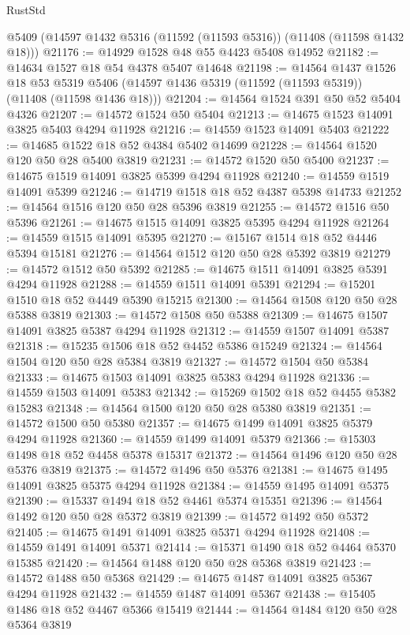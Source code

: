 \begin{lexlean}{RustStd}
\begin{coremodule}
    @5409
    (@14597 @1432 @5316 (@11592 (@11593 @5316)) (@11408 (@11598 @1432 @18)))
@21176 := @14929 @1528 @48 @55 @4423 @5408 @14952
@21182 := @14634 @1527 @18 @54 @4378 @5407 @14648
@21198 := @14564
    @1437
    @1526
    @18
    @53
    @5319
    @5406
    (@14597 @1436 @5319 (@11592 (@11593 @5319)) (@11408 (@11598 @1436 @18)))
@21204 := @14564 @1524 @391 @50 @52 @5404 @4326
@21207 := @14572 @1524 @50 @5404
@21213 := @14675 @1523 @14091 @3825 @5403 @4294 @11928
@21216 := @14559 @1523 @14091 @5403
@21222 := @14685 @1522 @18 @52 @4384 @5402 @14699
@21228 := @14564 @1520 @120 @50 @28 @5400 @3819
@21231 := @14572 @1520 @50 @5400
@21237 := @14675 @1519 @14091 @3825 @5399 @4294 @11928
@21240 := @14559 @1519 @14091 @5399
@21246 := @14719 @1518 @18 @52 @4387 @5398 @14733
@21252 := @14564 @1516 @120 @50 @28 @5396 @3819
@21255 := @14572 @1516 @50 @5396
@21261 := @14675 @1515 @14091 @3825 @5395 @4294 @11928
@21264 := @14559 @1515 @14091 @5395
@21270 := @15167 @1514 @18 @52 @4446 @5394 @15181
@21276 := @14564 @1512 @120 @50 @28 @5392 @3819
@21279 := @14572 @1512 @50 @5392
@21285 := @14675 @1511 @14091 @3825 @5391 @4294 @11928
@21288 := @14559 @1511 @14091 @5391
@21294 := @15201 @1510 @18 @52 @4449 @5390 @15215
@21300 := @14564 @1508 @120 @50 @28 @5388 @3819
@21303 := @14572 @1508 @50 @5388
@21309 := @14675 @1507 @14091 @3825 @5387 @4294 @11928
@21312 := @14559 @1507 @14091 @5387
@21318 := @15235 @1506 @18 @52 @4452 @5386 @15249
@21324 := @14564 @1504 @120 @50 @28 @5384 @3819
@21327 := @14572 @1504 @50 @5384
@21333 := @14675 @1503 @14091 @3825 @5383 @4294 @11928
@21336 := @14559 @1503 @14091 @5383
@21342 := @15269 @1502 @18 @52 @4455 @5382 @15283
@21348 := @14564 @1500 @120 @50 @28 @5380 @3819
@21351 := @14572 @1500 @50 @5380
@21357 := @14675 @1499 @14091 @3825 @5379 @4294 @11928
@21360 := @14559 @1499 @14091 @5379
@21366 := @15303 @1498 @18 @52 @4458 @5378 @15317
@21372 := @14564 @1496 @120 @50 @28 @5376 @3819
@21375 := @14572 @1496 @50 @5376
@21381 := @14675 @1495 @14091 @3825 @5375 @4294 @11928
@21384 := @14559 @1495 @14091 @5375
@21390 := @15337 @1494 @18 @52 @4461 @5374 @15351
@21396 := @14564 @1492 @120 @50 @28 @5372 @3819
@21399 := @14572 @1492 @50 @5372
@21405 := @14675 @1491 @14091 @3825 @5371 @4294 @11928
@21408 := @14559 @1491 @14091 @5371
@21414 := @15371 @1490 @18 @52 @4464 @5370 @15385
@21420 := @14564 @1488 @120 @50 @28 @5368 @3819
@21423 := @14572 @1488 @50 @5368
@21429 := @14675 @1487 @14091 @3825 @5367 @4294 @11928
@21432 := @14559 @1487 @14091 @5367
@21438 := @15405 @1486 @18 @52 @4467 @5366 @15419
@21444 := @14564 @1484 @120 @50 @28 @5364 @3819

\end{coremodule}
\end{lexlean}
